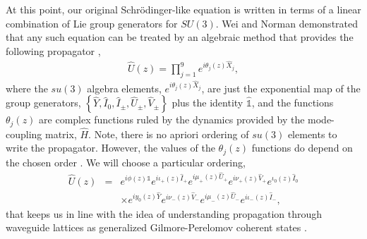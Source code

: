\documentclass[9pt,twocolumn,twoside]{osajnl}
\begin{document}
At this point, our original Schr\"odinger-like equation is written in terms of a linear combination of Lie group generators for $SU(3)$.
Wei and Norman demonstrated that any such equation can be treated by an algebraic method that provides the following propagator \cite{Wei1963p575},
\begin{eqnarray}
	\hat{U}(z) = \prod_{j=1}^{9} e^{i \theta_{j}(z) \hat{X}_{j}},
\end{eqnarray}
where the $su(3)$ algebra elements, $e^{i \theta_{j}(z) \hat{X}_{j}}$, are just the exponential map of the group generators, $\left\{ \hat{Y}, \hat{I}_{0}, \hat{I}_{\pm}, \hat{U}_{\pm}, \hat{V}_{\pm} \right\}$ plus the identity $\hat{\mathbb{1}}$, and the functions $\theta_{j}(z)$ are complex functions ruled by the dynamics provided by the mode-coupling matrix, $\hat{H}$.
Note, there is no apriori ordering of $su(3)$ elements to write the propagator. 
However, the values of the $\theta_{j}(z)$ functions do depend on the chosen order \cite{Dattoli1987p1582,Dattoli1991p1247}.
We will choose a particular ordering,
\begin{eqnarray}
\hat{U}(z) &=& e^{i \phi(z)\mathbb{1} }e^{i \iota_{+}(z) \hat{I}_{+}} e^{i \mu_{+}(z) \hat{U}_{+}}  
e^{i \nu_{+}(z) \hat{V}_{+}} e^{ \iota_{0}(z) \hat{I}_{0}} \nonumber \\ 
&& \times e^{i y_{0}(z) \hat{Y}}  e^{i \nu_{-}(z) \hat{V}_{-}} e^{i \mu_{-}(z) \hat{U}_{-}} e^{i \iota_{-}(z) \hat{I}_{-}}, \label{eq:prop}
\end{eqnarray}
that keeps us in line with the idea of understanding propagation through waveguide lattices as generalized Gilmore-Perelomov coherent states \cite{VillanuevaVergara2015p}.
\end{document}
